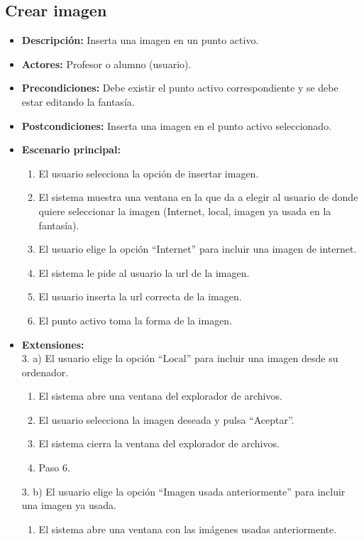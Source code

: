 \documentclass[12pt,letterpaper]{article}
\begin{document}
\subsection{Crear imagen}
\hypertarget{crearimagen}{}
\begin{itemize}
	\item \textbf{Descripción:} Inserta una imagen en un punto activo.
	\item \textbf{Actores:} Profesor o alumno (usuario).
	\item \textbf{Precondiciones:} Debe existir el punto activo correspondiente y se debe estar editando la fantasía.
	\item \textbf{Postcondiciones:} Inserta una imagen en el punto activo seleccionado.
	\item \textbf{Escenario principal:}
	\begin{enumerate}
		\item El usuario selecciona la opción de insertar imagen.
		\item El sistema muestra una ventana en la que da a elegir al usuario de donde quiere seleccionar la imagen (Internet, local, imagen ya usada en la fantasía).
		\item El usuario elige la opción ``Internet'' para incluir una imagen de internet.
		\item El sistema le pide al usuario la url de la imagen.
		\item El usuario inserta la url correcta de la imagen.
		\item El punto activo toma la forma de la imagen.
	\end{enumerate}
	\item \textbf{Extensiones:} \\3. a) El usuario elige la opción ``Local'' para incluir una imagen desde su ordenador.
	\begin{enumerate}
		\item El sistema abre una ventana del explorador de archivos.
		\item El usuario selecciona la imagen deseada y pulsa ``Aceptar''.
		\item El sistema cierra la ventana del explorador de archivos.
		\item Paso 6.
	\end{enumerate}
	3. b) El usuario elige la opción ``Imagen usada anteriormente'' para incluir una imagen ya usada.
	\begin{enumerate}
		\item El sistema abre una ventana con las imágenes usadas anteriormente.

\end{enumerate}
\end{itemize}
\end{document}
